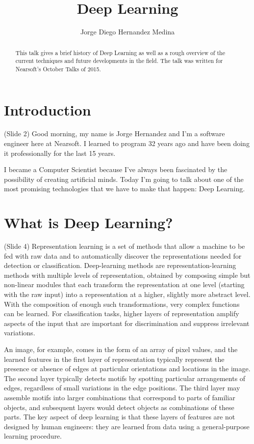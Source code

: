 \documentclass[twocolumn]{article}
\begin{document}
\title{Deep Learning}
\author{Jorge Diego Hernandez Medina}
\maketitle

\begin{abstract}
This talk gives a brief history of Deep Learning as well as a rough overview of
the current techniques and future developments in the field. The talk was
written for  Nearsoft's October Talks of 2015.
\end{abstract}

\section{Introduction}
(Slide 2) Good morning, my name is Jorge Hernandez and I'm a software
engineer here at Nearsoft. I learned to program 32 years ago and have been doing
it professionally for the last 15 years.

I became a Computer Scientist because I've always been fascinated by the
possibility of creating artificial minds. Today I'm going to talk about one of
the most promising technologies that we have to make that happen: Deep Learning.

\section{What is Deep Learning?}
(Slide 4) Representation learning is a set of methods that allow a machine to be
fed with raw data and to automatically discover the representations needed for
detection or classification. Deep-learning methods are representation-learning
methods with multiple levels of representation, obtained by composing simple but
non-linear modules that each transform the representation at one level (starting
with the raw input) into a representation at a higher, slightly more abstract
level. With the composition of enough such transformations, very complex
functions can be learned. For classification tasks, higher layers of
representation amplify aspects of the input that are important for
discrimination and suppress irrelevant variations.

An image, for example, comes in the form of an array of pixel values, and the
learned features in the first layer of representation typically represent the
presence or absence of edges at particular orientations and locations in the
image. The second layer typically detects motifs by spotting particular
arrangements of edges, regardless of small variations in the edge positions. The
third layer may assemble motifs into larger combinations that correspond to
parts of familiar objects, and subsequent layers would detect objects as
combinations of these parts. The key aspect of deep learning is that these
layers of features are not designed by human engineers: they are learned from
data using a general-purpose learning procedure.
\end{document}
